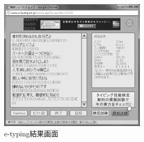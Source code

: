 \begin{figure}
 \begin{center}
   \includegraphics[width=7cm,clip]{res_x_i/ety_result1.eps}
 \end{center}
 \caption{e-typing結果画面}
 \label{x_i:ety_result1}
\end{figure}


